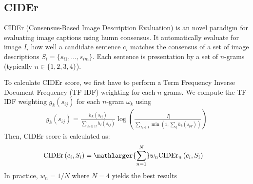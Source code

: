 \subsection{CIDEr}
CIDEr (Consensus-Based Image Description Evaluation) \cite{DBLP:journals/corr/VedantamZP14a} is an novel paradigm for evaluating image captions using humn consensus. It automatically evaluate for image $I_i$ how well a candidate sentence $c_i$ matches the consensus of a set of image descriptions $S_i = \{s_{i1}, \dots, s_{im}\}$. Each sentence is presentation by a set of $n$-grams (typically $n \in \{1, 2, 3, 4\}$).

To calculate CIDEr score, we first have to perform a Term Frequency Inverse Document Frequency (TF-IDF) weighting for each $n$-grams. We compute the TF-IDF weighting $g_k\left(s_{ij}\right)$ for each $n$-gram $\omega_k$ using
\begin{align}
	g_k\left(s_{ij}\right) = \frac{h_k\left(s_{ij}\right)}{\sum_{\omega_l \in \Omega} h_l \left(s_{ij}\right)} \log \left( \frac{|I|}{\sum_{I_p \in I} \min \left( 1, \sum_q h_k \left(s_{pq} \right)\right)}  \right)
\end{align}
Then, CIDEr score is calculated as:
	\begin{align}
		\centering
		\text{CIDEr} \left( c_i, S_i \right) &= \mathlarger{\sum_{n=1}^N} w_n \text{CIDEr}_n\left( c_i, S_i \right)
	\end{align}
In practice, $w_n = 1/N$ where $N = 4$ yields the best results